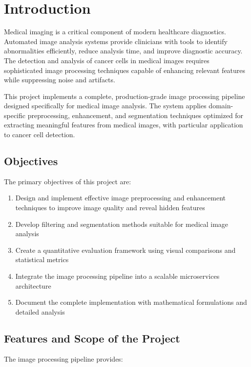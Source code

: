 \documentclass[12pt,a4paper]{article}
\begin{document}
\newpage

\section{Introduction}

Medical imaging is a critical component of modern healthcare diagnostics. Automated image analysis systems provide clinicians with tools to identify abnormalities efficiently, reduce analysis time, and improve diagnostic accuracy. The detection and analysis of cancer cells in medical images requires sophisticated image processing techniques capable of enhancing relevant features while suppressing noise and artifacts.

This project implements a complete, production-grade image processing pipeline designed specifically for medical image analysis. The system applies domain-specific preprocessing, enhancement, and segmentation techniques optimized for extracting meaningful features from medical images, with particular application to cancer cell detection.

\subsection{Objectives}

The primary objectives of this project are:

\begin{enumerate}
    \item Design and implement effective image preprocessing and enhancement techniques to improve image quality and reveal hidden features
    \item Develop filtering and segmentation methods suitable for medical image analysis
    \item Create a quantitative evaluation framework using visual comparisons and statistical metrics
    \item Integrate the image processing pipeline into a scalable microservices architecture
    \item Document the complete implementation with mathematical formulations and detailed analysis
\end{enumerate}

\subsection{Features and Scope of the Project}

The image processing pipeline provides:
\end{document}
